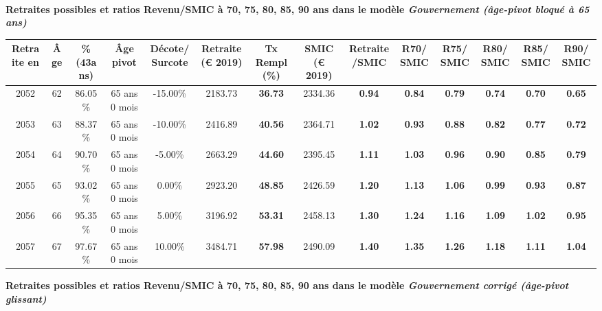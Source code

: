  ~\\{\bf \noindent Retraites possibles et ratios Revenu/SMIC à 70, 75, 80, 85, 90 ans dans le modèle \emph{Gouvernement (âge-pivot bloqué à 65 ans)}}  
 
\begin{adjustbox}{max width=\textwidth} 
\begin{tabular}[htb]{|c|c||c|c|c||c|c||c|c||c|c|c|c|c|} 
\hline 
 Retraite en &  Âge &  \%(43ans) &  Âge pivot &  Décote/Surcote &  Retraite (\euro{} 2019) &  Tx Rempl(\%) &  SMIC (\euro{} 2019) &  Retraite/SMIC &  R70/SMIC &  R75/SMIC &  R80/SMIC &  R85/SMIC &  R90/SMIC \\ 
\hline \hline 
 2052 &  62 &  86.05\% &  65 ans 0 mois &  -15.00\% &  2183.73 &  {\bf 36.73} &  2334.36 &  {\bf {\color{red} 0.94}} &  {\bf {\color{red} 0.84}} &  {\bf {\color{red} 0.79}} &  {\bf {\color{red} 0.74}} &  {\bf {\color{red} 0.70}} &  {\bf {\color{red} 0.65}} \\ 
\hline 
 2053 &  63 &  88.37\% &  65 ans 0 mois &  -10.00\% &  2416.89 &  {\bf 40.56} &  2364.71 &  {\bf 1.02} &  {\bf {\color{red} 0.93}} &  {\bf {\color{red} 0.88}} &  {\bf {\color{red} 0.82}} &  {\bf {\color{red} 0.77}} &  {\bf {\color{red} 0.72}} \\ 
\hline 
 2054 &  64 &  90.70\% &  65 ans 0 mois &  -5.00\% &  2663.29 &  {\bf 44.60} &  2395.45 &  {\bf 1.11} &  {\bf 1.03} &  {\bf {\color{red} 0.96}} &  {\bf {\color{red} 0.90}} &  {\bf {\color{red} 0.85}} &  {\bf {\color{red} 0.79}} \\ 
\hline 
 2055 &  65 &  93.02\% &  65 ans 0 mois &  0.00\% &  2923.20 &  {\bf 48.85} &  2426.59 &  {\bf 1.20} &  {\bf 1.13} &  {\bf 1.06} &  {\bf {\color{red} 0.99}} &  {\bf {\color{red} 0.93}} &  {\bf {\color{red} 0.87}} \\ 
\hline 
 2056 &  66 &  95.35\% &  65 ans 0 mois &  5.00\% &  3196.92 &  {\bf 53.31} &  2458.13 &  {\bf 1.30} &  {\bf 1.24} &  {\bf 1.16} &  {\bf 1.09} &  {\bf 1.02} &  {\bf {\color{red} 0.95}} \\ 
\hline 
 2057 &  67 &  97.67\% &  65 ans 0 mois &  10.00\% &  3484.71 &  {\bf 57.98} &  2490.09 &  {\bf 1.40} &  {\bf 1.35} &  {\bf 1.26} &  {\bf 1.18} &  {\bf 1.11} &  {\bf 1.04} \\ 
\hline 
\hline 
\end{tabular} 
\end{adjustbox} 
 
 \vspace{0.1cm} 
{\bf \noindent Retraites possibles et ratios Revenu/SMIC à 70, 75, 80, 85, 90 ans dans le modèle \emph{Gouvernement corrigé (âge-pivot glissant)}}  
 
